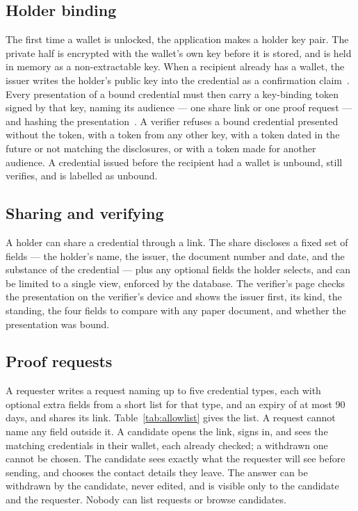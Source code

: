 \documentclass[10pt,a4paper,twocolumn]{article}
\begin{document}
\subsection{Holder binding}

The first time a wallet is unlocked, the application makes a holder key pair. The
private half is encrypted with the wallet's own key before it is stored, and is
held in memory as a non-extractable key. When a recipient already has a wallet,
the issuer writes the holder's public key into the credential as a confirmation
claim~\citep{rfc7800}. Every presentation of a bound credential must then carry a
key-binding token signed by that key, naming its audience --- one share link or
one proof request --- and hashing the presentation~\citep{rfc9901}. A verifier
refuses a bound credential presented without the token, with a token from any
other key, with a token dated in the future or not matching the disclosures, or
with a token made for another audience. A credential issued before the recipient
had a wallet is unbound, still verifies, and is labelled as unbound.

\subsection{Sharing and verifying}

A holder can share a credential through a link. The share discloses a fixed set
of fields --- the holder's name, the issuer, the document number and date, and the
substance of the credential --- plus any optional fields the holder selects, and
can be limited to a single view, enforced by the database. The verifier's page
checks the presentation on the verifier's device and shows the issuer first, its
kind, the standing, the four fields to compare with any paper document, and
whether the presentation was bound.

\subsection{Proof requests}
\label{sec:proofrequests}

A requester writes a request naming up to five credential types, each with
optional extra fields from a short list for that type, and an expiry of at most
90 days, and shares its link. Table~\ref{tab:allowlist} gives the list. A request
cannot name any field outside it. A candidate opens the link, signs in, and sees
the matching credentials in their wallet, each already checked; a withdrawn one
cannot be chosen. The candidate sees exactly what the requester will see before
sending, and chooses the contact details they leave. The answer can be withdrawn
by the candidate, never edited, and is visible only to the candidate and the
requester. Nobody can list requests or browse candidates.
\end{document}
